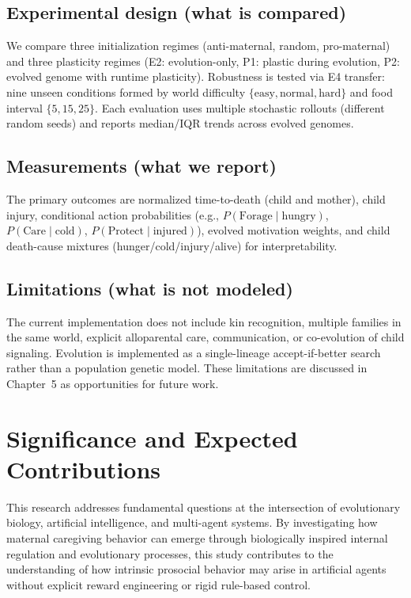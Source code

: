 \subsection{Experimental design (what is compared)}
We compare three initialization regimes (anti-maternal, random, pro-maternal) and three plasticity regimes (E2: evolution-only, P1: plastic during evolution, P2: evolved genome with runtime plasticity). Robustness is tested via E4 transfer: nine unseen conditions formed by world difficulty $\{\text{easy},\text{normal},\text{hard}\}$ and food interval $\{5,15,25\}$. Each evaluation uses multiple stochastic rollouts (different random seeds) and reports median/IQR trends across evolved genomes.

\subsection{Measurements (what we report)}
The primary outcomes are normalized time-to-death (child and mother), child injury, conditional action probabilities (e.g., $P(\text{Forage}\mid\text{hungry})$, $P(\text{Care}\mid\text{cold})$, $P(\text{Protect}\mid\text{injured})$), evolved motivation weights, and child death-cause mixtures (hunger/cold/injury/alive) for interpretability.

\subsection{Limitations (what is not modeled)}
The current implementation does not include kin recognition, multiple families in the same world, explicit alloparental care, communication, or co-evolution of child signaling. Evolution is implemented as a single-lineage accept-if-better search rather than a population genetic model. These limitations are discussed in Chapter~5 as opportunities for future work.


\section{Significance and Expected Contributions}

This research addresses fundamental questions at the intersection of evolutionary biology, artificial intelligence, and multi-agent systems. By investigating how maternal caregiving behavior can emerge through biologically inspired internal regulation and evolutionary processes, this study contributes to the understanding of how intrinsic prosocial behavior may arise in artificial agents without explicit reward engineering or rigid rule-based control.

